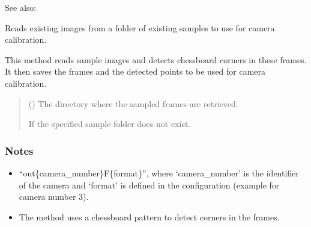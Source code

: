 \documentclass[letterpaper,10pt,english]{sphinxmanual}
\begin{document}
\begin{fulllineitems}
\begin{fulllineitems}
\begin{sphinxseealso}{See also:}
\end{sphinxseealso}


\end{fulllineitems}


\begin{fulllineitems}
\label{\detokenize{CameraUtils:id9}}
\pysigstartsignatures
{}
\pysigstopsignatures
\sphinxAtStartPar
Reads existing images from a folder of existing samples to use for camera calibration.

\sphinxAtStartPar
This method reads sample images and detects chessboard corners
in these frames. It then saves the frames and the detected points
to be used for camera calibration.
\begin{quote}\begin{description}
\sphinxAtStartPar
{} () \textendash{} The directory where the sampled frames are retrieved.

\sphinxAtStartPar
{} \textendash{} If the specified sample folder does not exist.

\end{description}\end{quote}
\subsubsection*{Notes}
\begin{itemize}
\item {} \begin{description}
\sphinxAtStartPar
“out\{camera\_number\}F\{format\}”,
where ‘camera\_number’ is the identifier
of the camera and ‘format’ is defined in the configuration
(example  for camera number 3).

\end{description}

\item {} 
\sphinxAtStartPar
The method uses a chessboard pattern to detect corners in the frames.


\end{itemize}
\end{fulllineitems}
\end{fulllineitems}
\end{document}
